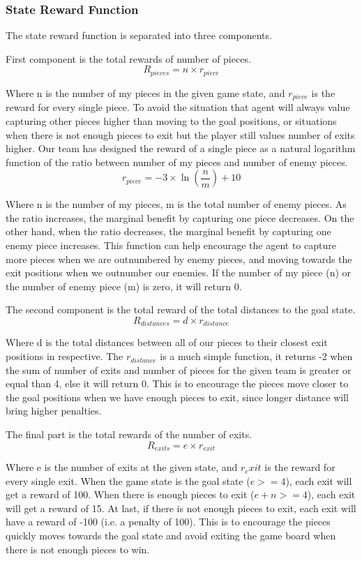 \documentclass[UTF8,11pt]{article}
\begin{document}
        \subsubsection{State Reward Function}
        The state reward function is separated into three components. \par
        First component is
        the total rewards of number of pieces. 
        \[R_{pieces} = n \times r_{piece}\]\par
        Where n is the number of my pieces in the given game state, and $r_{piece}$ is
        the reward for every single piece. To avoid the situation that agent will always
        value capturing other pieces higher than moving to the goal positions, or situations when there
        is not enough pieces to exit but the player still values number of exits higher. Our team
        has designed the reward of a single piece as a natural logarithm function of the ratio between
        number of my pieces and number of enemy pieces. 
        \[r_{piece} = -3 \times \ln(\frac{n}{m}) + 10\]\par
        Where n is the number of my pieces, m is the total number of enemy pieces. As the
        ratio increases, the marginal benefit by capturing one piece decreases. On the
        other hand, when the ratio decreases, the marginal benefit by capturing one
        enemy piece increases. This function can help encourage the agent to capture
        more pieces when we are outnumbered by enemy pieces, and moving towards the
        exit positions when we outnumber our enemies. If the number of my piece (n) or
        the number of enemy piece (m) is zero, it will return 0.\par
        The second component is the total reward of the total distances to the goal
        state.
        \[R_{distances} = d \times r_{distance}\]\par
        Where d is the total distances between all of our pieces to their closest
        exit positions in respective. The $r_{distance}$ is a much simple function, 
        it returns -2 when the sum of number of exits and number of pieces for the
        given team is greater or equal than 4, else it will return 0. This is to encourage
        the pieces move closer to the goal positions when we have enough pieces to exit, since
        longer distance will bring higher penalties.\par
        The final part is the total rewards of the number of exits.
        \[R_{exits} = e \times r_{exit}\]\par
        Where e is the number of exits at the given state, and $r_exit$ is the reward
        for every single exit. When the game state is the goal state ($e >= 4$), 
        each exit will get a reward of 100. When there is enough pieces to
        exit ($e + n >= 4$), each exit will get a reward of 15. At last, if there is
        not enough pieces to exit, each exit will have a reward of -100 (i.e. a penalty
        of 100). This is to encourage the pieces quickly moves towards the goal state and
        avoid exiting the game board when there is not enough pieces to win.
\end{document}
